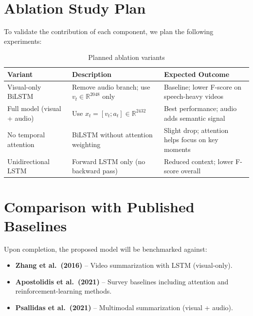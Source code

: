 \documentclass[12pt, a4paper]{report}
\begin{document}
\section{Ablation Study Plan}

To validate the contribution of each component, we plan the following experiments:

\begin{table}[H]
\centering
\caption{Planned ablation variants}
\label{tab:ablation}
\begin{tabular}{lp{4.5cm}p{4.5cm}}
  \toprule
  \textbf{Variant} & \textbf{Description} & \textbf{Expected Outcome} \\
  \midrule
  Visual-only BiLSTM
    & Remove audio branch; use $v_t \in \mathbb{R}^{2048}$ only
    & Baseline; lower F-score on speech-heavy videos \\[6pt]
  Full model (visual + audio)
    & Use $x_t = [v_t; a_t] \in \mathbb{R}^{2432}$
    & Best performance; audio adds semantic signal \\[6pt]
  No temporal attention
    & BiLSTM without attention weighting
    & Slight drop; attention helps focus on key moments \\[6pt]
  Unidirectional LSTM
    & Forward LSTM only (no backward pass)
    & Reduced context; lower F-score overall \\
  \bottomrule
\end{tabular}
\end{table}

\section{Comparison with Published Baselines}

Upon completion, the proposed model will be benchmarked against:
\begin{itemize}[leftmargin=1.5cm]
  \item \textbf{Zhang et al.\ (2016)} \cite{zhang2016} -- Video summarization with LSTM (visual-only).
  \item \textbf{Apostolidis et al.\ (2021)} \cite{apostolidis2021} -- Survey baselines including
        attention and reinforcement-learning methods.
  \item \textbf{Psallidas et al.\ (2021)} \cite{psallidas2021} -- Multimodal summarization
        (visual + audio).
\end{itemize}

\end{document}
